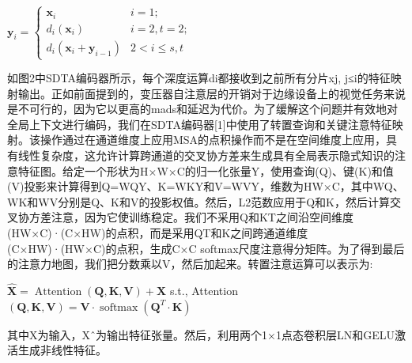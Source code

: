 \documentclass[12pt]{article}
\begin{document}
$\boldsymbol{y}_{i}=\left\{\begin{array}{ll}\boldsymbol{x}_{i} & i=1 ; \\ d_{i}\left(\boldsymbol{x}_{i}\right) & i=2, t=2 ; \\ d_{i}\left(\boldsymbol{x}_{i}+\boldsymbol{y}_{i-1}\right) & 2<i \leq s, t\end{array}\right.$

如图2中SDTA编码器所示，每个深度运算di都接收到之前所有分片{xj, j≤i}的特征映射输出。正如前面提到的，变压器自注意层的开销对于边缘设备上的视觉任务来说是不可行的，因为它以更高的mads和延迟为代价。为了缓解这个问题并有效地对全局上下文进行编码，我们在SDTA编码器[1]中使用了转置查询和关键注意特征映射。该操作通过在通道维度上应用MSA的点积操作而不是在空间维度上应用，具有线性复杂度，这允许计算跨通道的交叉协方差来生成具有全局表示隐式知识的注意特征图。给定一个形状为H×W×C的归一化张量Y，使用查询(Q)、键(K)和值(V)投影来计算得到Q=WQY、K=WKY和V=WVY，维数为HW×C，其中WQ、WK和WV分别是Q、K和V的投影权值。然后，L2范数应用于Q和K，然后计算交叉协方差注意，因为它使训练稳定。我们不采用Q和KT之间沿空间维度(HW×C)·(C×HW)的点积，而是采用QT和K之间跨通道维度(C×HW)·(HW×C)的点积，生成C×C softmax尺度注意得分矩阵。为了得到最后的注意力地图，我们把分数乘以V，然后加起来。转置注意运算可以表示为:

$\hat{\boldsymbol{X}}=\operatorname{Attention}(\boldsymbol{Q}, \boldsymbol{K}, \boldsymbol{V})+\boldsymbol{X}$
s.t., Attention $(\boldsymbol{Q}, \boldsymbol{K}, \boldsymbol{V})=\boldsymbol{V} \cdot \operatorname{softmax}\left(\boldsymbol{Q}^{T} \cdot \boldsymbol{K}\right)$

其中X为输入，Xˆ为输出特征张量。然后，利用两个1×1点态卷积层LN和GELU激活生成非线性特征。



\end{document}
